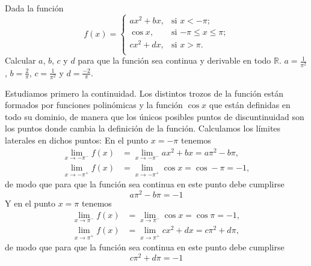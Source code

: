 {Dada la función
\[f(x)=
\begin{cases}
ax^2+bx, & \mbox{si $x<-\pi$;} \\
\cos x, & \mbox{si $-\pi\leq x\leq \pi$;} \\
cx^2+dx, & \mbox{si $x>\pi$.} \\
\end{cases}
\]
Calcular $a$, $b$, $c$ y $d$ para que la función sea continua y derivable en todo $\mathbb{R}$.
}
{$a = \frac{1}{\pi^{2}}$, $b=\frac{2}{\pi}$, $c = \frac{1}{\pi^{2}}$ y $d=\frac{-2}{\pi}$.
}
{Estudiamos primero la continuidad. Los distintos trozos de la función están formados por funciones polinómicas y la función $\cos x$ que están definidas en todo su dominio, de manera que los únicos posibles puntos de discuntinuidad son los puntos donde cambia la definición de la función. Calculamos los límites laterales en dichos puntos: En el punto $x=-\pi$ tenemos
\begin{align*}
\lim_{x\rightarrow -\pi^{-}} f(x) &=  \lim_{x\rightarrow -\pi^{-}} ax^{2}+bx = a\pi^{2}-b\pi,\\
\lim_{x\rightarrow -\pi^{+}} f(x) &=  \lim_{x\rightarrow -\pi^{+}} \cos x = \cos -\pi = -1,
\end{align*}
de modo que para que la función sea continua en este punto debe cumplirse
\begin{equation}
a\pi^{2}-b\pi = -1
\label{e:1}
\end{equation}
Y en el punto $x=\pi$ tenemos
\begin{align*}
\lim_{x\rightarrow \pi^{-}} f(x) &=  \lim_{x\rightarrow \pi^{-}} \cos x = \cos\pi = -1,\\
\lim_{x\rightarrow \pi^{+}} f(x) &=  \lim_{x\rightarrow \pi^{+}} cx^{2}+dx =  c\pi^{2}+d\pi,
\end{align*}
de modo que para que la función sea continua en este punto debe cumplirse
\begin{equation}
c\pi^{2}+d\pi = -1
\label{e:2}
\end{equation}

}
